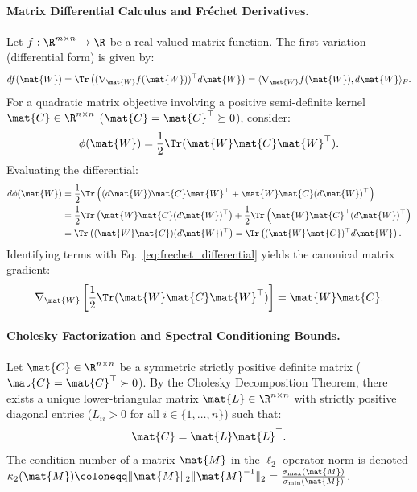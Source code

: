 \paragraph{Matrix Differential Calculus and Fr\'echet Derivatives.}
Let $f: \R^{m \times n} \to \R$ be a real-valued matrix function. The first variation (differential form) is given by:
\begin{equation}
df(\mat{W}) = \Tr\left( (\nabla_{\mat{W}} f(\mat{W}))^\top d\mat{W} \right) = \langle \nabla_{\mat{W}} f(\mat{W}), d\mat{W} \rangle_F.
\label{eq:frechet_differential}
\end{equation}
For a quadratic matrix objective involving a positive semi-definite kernel $\mat{C} \in \R^{n \times n}$ ($\mat{C} = \mat{C}^\top \succeq 0$), consider:
\begin{equation}
\phi(\mat{W}) = \frac{1}{2} \Tr(\mat{W} \mat{C} \mat{W}^\top).
\end{equation}
Evaluating the differential:
\begin{align}
d\phi(\mat{W}) &= \frac{1}{2} \Tr\left( (d\mat{W}) \mat{C} \mat{W}^\top + \mat{W} \mat{C} (d\mat{W})^\top \right) \nonumber \\
&= \frac{1}{2} \Tr\left( \mat{W} \mat{C} (d\mat{W})^\top \right) + \frac{1}{2} \Tr\left( \mat{W} \mat{C}^\top (d\mat{W})^\top \right) \nonumber \\
&= \Tr\left( (\mat{W} \mat{C}) (d\mat{W})^\top \right) = \Tr\left( (\mat{W} \mat{C})^\top d\mat{W} \right).
\end{align}
Identifying terms with Eq.~\eqref{eq:frechet_differential} yields the canonical matrix gradient:
\begin{equation}
\nabla_{\mat{W}} \left[ \frac{1}{2} \Tr(\mat{W} \mat{C} \mat{W}^\top) \right] = \mat{W} \mat{C}.
\label{eq:quadratic_matrix_gradient}
\end{equation}

\paragraph{Cholesky Factorization and Spectral Conditioning Bounds.}
Let $\mat{C} \in \R^{n \times n}$ be a symmetric strictly positive definite matrix ($\mat{C} = \mat{C}^\top \succ 0$). By the Cholesky Decomposition Theorem, there exists a unique lower-triangular matrix $\mat{L} \in \R^{n \times n}$ with strictly positive diagonal entries ($L_{ii} > 0$ for all $i \in \{1, \dots, n\}$) such that:
\begin{equation}
\mat{C} = \mat{L} \mat{L}^\top.
\label{eq:cholesky_def}
\end{equation}
The condition number of a matrix $\mat{M}$ in the $\ell_2$ operator norm is denoted $\kappa_2(\mat{M}) \coloneqq \|\mat{M}\|_2 \|\mat{M}^{-1}\|_2 = \frac{\sigma_{\max}(\mat{M})}{\sigma_{\min}(\mat{M})}$.

